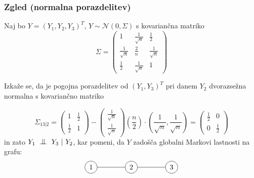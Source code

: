 \documentclass{beamer}
\newcommand{\cond}{\mathrel{\text{\scalebox{1.07}{$\perp\mkern-10mu\perp$}}}}
\begin{document}
\begin{frame}
    \frametitle{Zgled (normalna porazdelitev)}
    Naj bo $Y = (Y_1, Y_2, Y_3)^T$, $Y \sim \mathcal{N} (0,\Sigma)$ s kovariančna matriko
    \begin{equation*}
    \Sigma =
    \begin{pmatrix}
        1 & \frac{1}{\sqrt{n}} & \frac{1}{2}\\
        \frac{1}{\sqrt{n}} & \frac{2}{n} &\frac{1}{\sqrt{n}}\\
        \frac{1}{2} & \frac{1}{\sqrt{n}} & 1
    \end{pmatrix}	
\end{equation*}

Izkaže se, da je pogojna porazdelitev od $(Y_1, Y_3)^T$ pri danem $Y_2$ dvorazsežna normalna
s kovariančno matriko

\begin{equation*}
    \Sigma_{13|2} = 
    \begin{pmatrix}
        1 &  \frac{1}{2}\\
        \frac{1}{2} &  1
    \end{pmatrix}
    -
    \begin{pmatrix}
        \frac{1}{\sqrt{n}}\\
        \frac{1}{\sqrt{n}}
    \end{pmatrix}
    (\frac{n}{2}) \cdot (\frac{1}{\sqrt{n}}, \frac{1}{\sqrt{n}}) = 
    \begin{pmatrix}
        \frac{1}{2} &  0\\
        0 &  \frac{1}{2}
    \end{pmatrix}
\end{equation*}
in zato $Y_1 ~ \cond ~ Y_3 ~|~ Y_2$, kar pomeni, da $Y$ zadošča globalni Markovi lastnosti na grafu:
\begin{align*}
    
\begin{tikzpicture}
    \node[shape=circle,draw=black] (X) at (7,0) {1};
    \node[shape=circle,draw=black] (Y) at (9,0) {2};
    \node[shape=circle,draw=black] (Z) at (11,0) {3};
    \path [-] (Y) edge node[left] {} (Z);
    \path [-] (X) edge node[left] {} (Y);
\end{tikzpicture}
\end{align*}


\end{frame}

\end{document}
